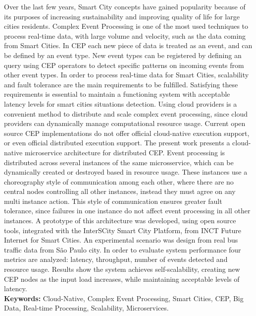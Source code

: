 \documentclass[11pt,twoside,a4paper]{book}
\begin{document}
Over the last few years, Smart City concepts have gained popularity because of its purposes of increasing sustainability and improving quality of life for large cities residents. Complex Event Processing is one of the most used techniques to process real-time data, with large volume and velocity, such as the data coming from Smart Cities. In CEP each new piece of data is treated as an event, and can be defined by an event type. New event types can be registered by defining an query using CEP operators to detect specific patterns on incoming events from other event types. In order to process real-time data for Smart Cities, scalability and fault tolerance are the main requirements to be fulfilled. Satisfying these requirements is essential to maintain a functioning system with acceptable latency levels for smart cities situations detection. Using cloud providers is a convenient method  to distribute and scale complex event processing, since cloud providers can dynamically manage computational resource usage. Current open source CEP implementations do not offer official cloud-native execution support, or even official distributed execution support.  The present work presents a cloud-native microservice architecture for distributed CEP. Event processing is distributed across several instances of the same microsservice, which can be dynamically created or destroyed based in resource usage. These instances use a choreography style of communication among each other, where there are no central nodes controlling all other instances, instead they must agree on any multi instance action. This style of communication ensures greater fault tolerance, since failures in one instance do not affect event processing in all other instances. A prototype of this architecture was developed, using open source tools, integrated with the InterSCity Smart City Platform, from INCT Future Internet for Smart Cities. An experimental scenario was design from real bus traffic data from São Paulo city.
In order to evaluate system performance four metrics are analyzed: latency, throughput, number of events detected and resource usage. Results show the system achieves self-scalability, creating new CEP nodes as the input load increases, while maintaining acceptable levels of latency. 
\\



\noindent \textbf{Keywords:} Cloud-Native, Complex Event Processing, Smart Cities, CEP, Big Data, Real-time Processing, Scalability, Microservices.
\end{document}
